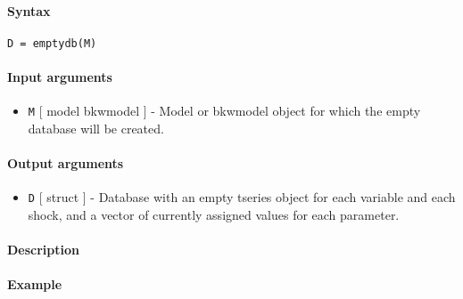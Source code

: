 


	\paragraph{Syntax}

\begin{verbatim}
D = emptydb(M)
\end{verbatim}

\paragraph{Input arguments}

\begin{itemize}
\itemsep1pt\parskip0pt
\item
  \texttt{M} {[} model \textbar{} bkwmodel {]} - Model or bkwmodel
  object for which the empty database will be created.
\end{itemize}

\paragraph{Output arguments}

\begin{itemize}
\itemsep1pt\parskip0pt
\item
  \texttt{D} {[} struct {]} - Database with an empty tseries object for
  each variable and each shock, and a vector of currently assigned
  values for each parameter.
\end{itemize}

\paragraph{Description}

\paragraph{Example}


